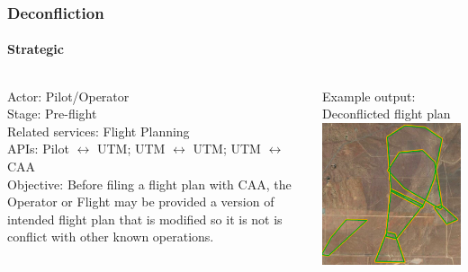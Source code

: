 \documentclass[usenames,dvipsnames,aspectratio=169,serif]{beamer}
\begin{document}

\begin{frame}
   \frametitle{Deconfliction}
   \framesubtitle{Strategic}
   \begin{columns}[t]
      \begin{column}{0.5\textwidth}
         Actor: Pilot/Operator \\
         Stage: Pre-flight \\
         Related services: Flight Planning \\
         APIs: Pilot $\leftrightarrow$ UTM; UTM $\leftrightarrow$ UTM; UTM $\leftrightarrow$ CAA \\

         Objective: Before filing a flight plan with CAA, the Operator or Flight may be provided a version of intended flight plan that is modified so it is not is conflict with other known operations.
      \end{column}
      \begin{column}{0.5\textwidth}
         Example output: Deconflicted flight plan \\
         \includegraphics[height=0.45\textwidth]{img/strategic-deconfliction.png}
      \end{column}
   \end{columns}
\end{frame}
\end{document}
